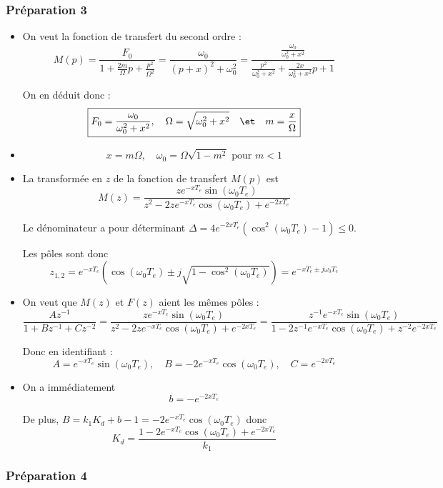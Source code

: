 \documentclass[../../Cours_M1.tex]{subfiles}
\newcommand{\z}{z^{-1}}
\begin{document}
\subsubsection*{Préparation 3}
\begin{itemize}\setlength{\itemsep}{10mm}

\item On veut la fonction de transfert du second ordre :
\[ M(p) = \frac{F_0}{1+\frac{2m}{\Omega}p+\frac{p^2}{\Omega^2}} = \frac{\omega_0}{(p+x)^2 + \omega_0^2} = \frac{\frac{\omega_0}{\omega_0^2+x^2}}{\frac{p^2}{\omega_0^2+x^2}+\frac{2x}{\omega_0^2 + x^2}p +1}\]

On en déduit donc : \[ \boxed{ F_0 = \frac{\omega_0}{\omega_0^2 + x^2}, \quad \Omega = \sqrt{\omega_0^2 + x^2} \quad \et \quad m=\frac{x}{\Omega}} \]

\item \[ \boxed{x = m\Omega, \quad \omega_0=\Omega\sqrt{1-m^2} \text{ pour } m< 1 } \]

\item La transformée en $z$ de la fonction de transfert $M(p)$ est 
\[ M(z) = \frac{ze^{-xT_e}\sin(\omega_0T_e)}{z^2 - 2ze^{-xT_e}\cos(\omega_0T_e)+e^{-2xT_e}} \]

Le dénominateur a pour déterminant $\Delta = 4e^{-2xT_e}(\cos^2(\omega_0T_e)-1) \leq 0$.

Les pôles sont donc \[z_{1,2} = e^{-xT_e}(\cos(\omega_0T_e) \pm j \sqrt{1-\cos^2(\omega_0T_e)}) = e^{-xT_e\pm j\omega_0T_e}\]

\item On veut que $M(z)$ et $F(z)$ aient les mêmes pôles :
\[ \frac{A\z}{1+B\z+Cz^{-2}} = \frac{ze^{-xT_e}\sin(\omega_0T_e)}{z^2 - 2ze^{-xT_e}\cos(\omega_0T_e)+e^{-2xT_e}} = \frac{\z e^{-xT_e}\sin(\omega_0T_e)}{1 - 2\z e^{-xT_e}\cos(\omega_0T_e)+z^{-2}e^{-2xT_e}} \]

Donc en identifiant :
\[ \boxed{ A = e^{-xT_e}\sin(\omega_0T_e), \quad B = -2 e^{-xT_e}\cos(\omega_0T_e), \quad C = e^{-2xT_e}} \]

\item On a immédiatement
\[ \boxed{ b = -e^{-2xT_e}} \]

De plus, $B = k_1K_d + b -1 = -2 e^{-xT_e}\cos(\omega_0T_e)$ donc 
\[ \boxed{ K_d = \frac{1-2 e^{-xT_e}\cos(\omega_0T_e)+e^{-2xT_e}}{k_1} }\]
\end{itemize}

\subsubsection*{Préparation 4}
\end{document}
